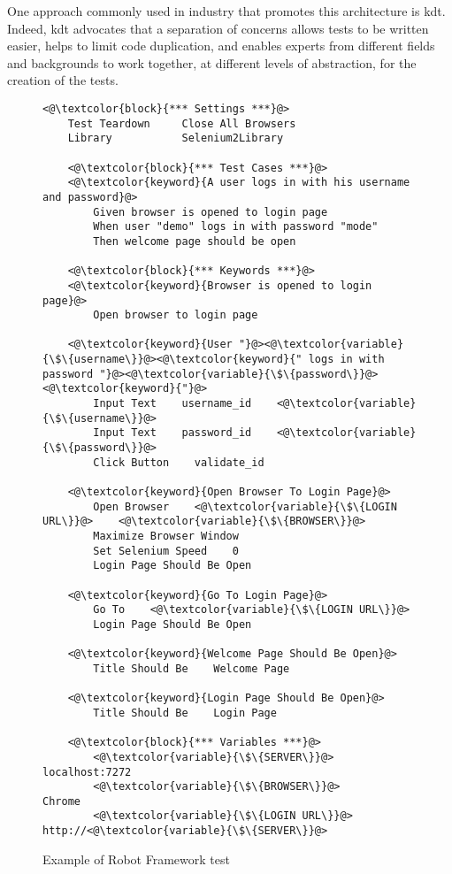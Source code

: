 One approach commonly used in industry that promotes this architecture is \gls{kdt}. Indeed, \gls{kdt} advocates that a separation of concerns allows tests to be written easier, helps to limit code duplication, and enables experts from different fields and backgrounds to work together, at different levels of abstraction, for the creation of the tests.

\begin{figure}
\centering
\caption{Example of Robot Framework test}
\label{fig:robot-script}
\begin{minipage}{0.8\linewidth}
\begin{lstlisting}[]
    <@\textcolor{block}{*** Settings ***}@>
    Test Teardown     Close All Browsers
    Library           Selenium2Library
    
    <@\textcolor{block}{*** Test Cases ***}@>
    <@\textcolor{keyword}{A user logs in with his username and password}@>
        Given browser is opened to login page
        When user "demo" logs in with password "mode"
        Then welcome page should be open
    
    <@\textcolor{block}{*** Keywords ***}@>
    <@\textcolor{keyword}{Browser is opened to login page}@>
        Open browser to login page
    
    <@\textcolor{keyword}{User "}@><@\textcolor{variable}{\$\{username\}}@><@\textcolor{keyword}{" logs in with password "}@><@\textcolor{variable}{\$\{password\}}@><@\textcolor{keyword}{"}@>
        Input Text    username_id    <@\textcolor{variable}{\$\{username\}}@>
        Input Text    password_id    <@\textcolor{variable}{\$\{password\}}@>
        Click Button    validate_id
    
    <@\textcolor{keyword}{Open Browser To Login Page}@>
        Open Browser    <@\textcolor{variable}{\$\{LOGIN URL\}}@>    <@\textcolor{variable}{\$\{BROWSER\}}@>
        Maximize Browser Window
        Set Selenium Speed    0
        Login Page Should Be Open        
    
    <@\textcolor{keyword}{Go To Login Page}@>
        Go To    <@\textcolor{variable}{\$\{LOGIN URL\}}@>
        Login Page Should Be Open
        
    <@\textcolor{keyword}{Welcome Page Should Be Open}@>
        Title Should Be    Welcome Page
        
    <@\textcolor{keyword}{Login Page Should Be Open}@>
        Title Should Be    Login Page
    
    <@\textcolor{block}{*** Variables ***}@>
        <@\textcolor{variable}{\$\{SERVER\}}@>           localhost:7272
        <@\textcolor{variable}{\$\{BROWSER\}}@>          Chrome        
        <@\textcolor{variable}{\$\{LOGIN URL\}}@>        http://<@\textcolor{variable}{\$\{SERVER\}}@>
\end{lstlisting}
\end{minipage}
\end{figure}

